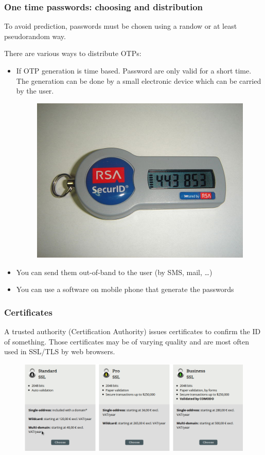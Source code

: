 \begin{frame}
\frametitle{One time passwords: choosing and distribution}

To avoid prediction, passwords must be chosen using a randow or at
least pseudorandom way.

There are various ways to distribute OTPs:
\begin{itemize}
\item If OTP generation is time based. Password are only valid for a
  short time. The generation can be done by a small electronic
  device which can be carried by the user.
\begin{figure}
  \includegraphics[width= 0.3\linewidth]{img/SecureID_token_new.JPG}
\end{figure}
\item You can send them out-of-band to the user (by SMS, mail, \ldots)
\item You can use a software on mobile phone that generate the passwords
\end{itemize}
\end{frame}


\begin{frame}
\frametitle{Certificates}
A trusted authority (Certification Authority) issues certificates to
confirm the ID of something. Those certificates may be of varying
quality and are most often used in SSL/TLS by web browsers.
\begin{figure}
  \includegraphics[width= 0.8\linewidth]{img/certificatesVariety.png}
\end{figure}
\end{frame}


